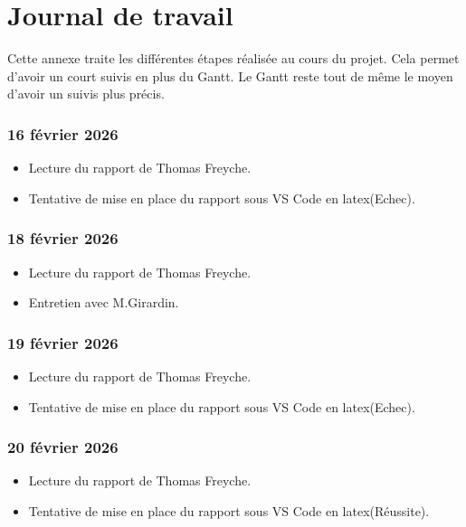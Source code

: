 \chapter{Journal de travail}
Cette annexe traite les différentes étapes réalisée au cours du projet. Cela permet d'avoir un court suivis en plus du Gantt. Le Gantt reste tout de même le moyen d'avoir un suivis plus précis.


\subsection*{16 février 2026}

\begin{itemize}
    \item Lecture du rapport de Thomas Freyche.
    \item Tentative de mise en place du rapport sous VS Code en latex(Echec).
\end{itemize}

\subsection*{18 février 2026}

\begin{itemize}
    \item Lecture du rapport de Thomas Freyche.
    \item Entretien avec M.Girardin.
\end{itemize}

\subsection*{19 février 2026}

\begin{itemize}
    \item Lecture du rapport de Thomas Freyche.
    \item Tentative de mise en place du rapport sous VS Code en latex(Echec).
\end{itemize}

\subsection*{20 février 2026}

\begin{itemize}
    \item Lecture du rapport de Thomas Freyche.
    \item Tentative de mise en place du rapport sous VS Code en latex(Réussite).
\end{itemize}


